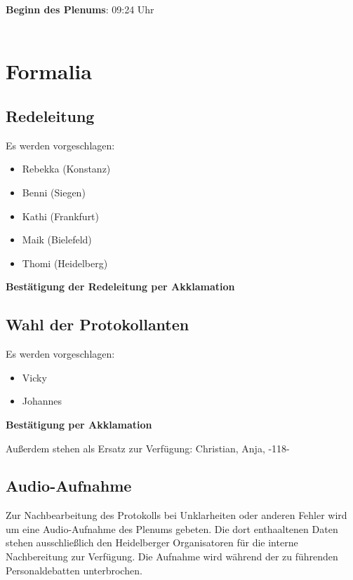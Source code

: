 
\textbf{Beginn des Plenums}: 09:24 Uhr \\ \\

\section{Formalia}
  \subsection{Redeleitung}
    Es werden vorgeschlagen:
    \begin{itemize}
      \item Rebekka (Konstanz)
      \item Benni (Siegen)
      \item Kathi (Frankfurt)
      \item Maik (Bielefeld)
      \item Thomi (Heidelberg)
    \end{itemize}

    \begin{success}{}
      \begin{center}
        \textbf{Bestätigung der Redeleitung per Akklamation}
      \end{center}
    \end{success}

  \subsection{Wahl der Protokollanten}
    Es werden vorgeschlagen:
    \begin{itemize}
      \item Vicky
      \item Johannes
    \end{itemize}

    \begin{success}{}
      \begin{center}
        \textbf{Bestätigung per Akklamation}
      \end{center}
    \end{success}
    Außerdem stehen als Ersatz zur Verfügung: Christian, Anja, -118-

  \subsection{Audio-Aufnahme}
    Zur Nachbearbeitung des Protokolls bei Unklarheiten oder anderen Fehler wird um eine Audio-Aufnahme des Plenums gebeten.
    Die dort enthaaltenen Daten stehen ausschließlich den Heidelberger Organisatoren für die interne Nachbereitung zur Verfügung. Die Aufnahme wird während der zu führenden Personaldebatten unterbrochen.

